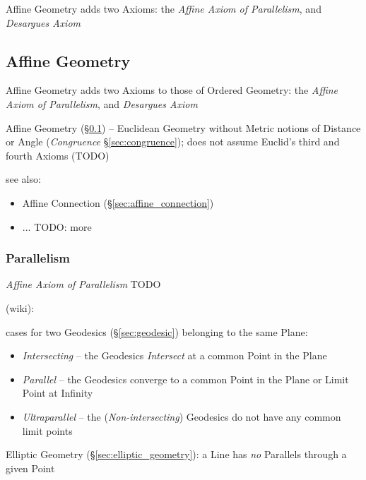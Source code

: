 Affine Geometry adds two Axioms: the \emph{Affine Axiom of Parallelism}, and
\emph{Desargues Axiom}



\subsection{Affine Geometry}\label{sec:affine_geometry}

Affine Geometry adds two Axioms to those of Ordered Geometry: the \emph{Affine
  Axiom of Parallelism}, and \emph{Desargues Axiom}

Affine Geometry (\S\ref{sec:affine_geometry}) -- Euclidean Geometry without
Metric notions of Distance or Angle (\emph{Congruence} \S\ref{sec:congruence});
does not assume Euclid's third and fourth Axioms (TODO)

see also:
\begin{itemize}
  \item Affine Connection (\S\ref{sec:affine_connection})
  \item ... TODO: more
\end{itemize}



\subsubsection{Parallelism}\label{sec:parallelism}

\emph{Affine Axiom of Parallelism} TODO

\asterism

(wiki):

cases for two Geodesics (\S\ref{sec:geodesic}) belonging to the same Plane:
\begin{itemize}
  \item \emph{Intersecting} -- the Geodesics \emph{Intersect} at a common Point
    in the Plane
  \item \emph{Parallel} -- the Geodesics converge to a common Point in the Plane
    or Limit Point at Infinity
  \item \emph{Ultraparallel} -- the (\emph{Non-intersecting}) Geodesics do not
    have any common limit points
\end{itemize}

\asterism

\fist Elliptic Geometry (\S\ref{sec:elliptic_geometry}): a Line has \emph{no}
  Parallels through a given Point

